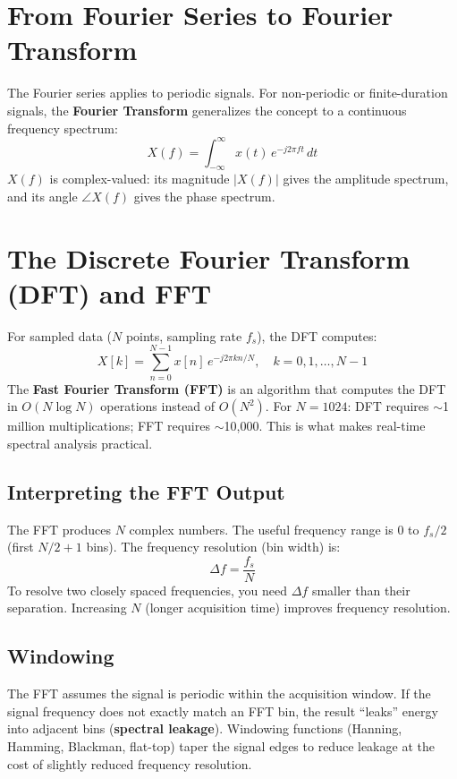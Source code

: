 \documentclass[11pt,letterpaper,twoside,openany]{book}
\begin{document}
\section{From Fourier Series to Fourier Transform}
The Fourier series applies to periodic signals. For non-periodic or finite-duration signals, the \textbf{Fourier Transform} generalizes the concept to a continuous frequency spectrum:
\begin{equation}
X(f) = \int_{-\infty}^{\infty} x(t) \, e^{-j2\pi f t} \, dt
\end{equation}
$X(f)$ is complex-valued: its magnitude $|X(f)|$ gives the amplitude spectrum, and its angle $\angle X(f)$ gives the phase spectrum.

\section{The Discrete Fourier Transform (DFT) and FFT}
For sampled data ($N$ points, sampling rate $f_s$), the DFT computes:
\begin{equation}
X[k] = \sum_{n=0}^{N-1} x[n] \, e^{-j2\pi kn/N}, \quad k = 0, 1, \ldots, N-1
\end{equation}
The \textbf{Fast Fourier Transform (FFT)} is an algorithm that computes the DFT in $O(N \log N)$ operations instead of $O(N^2)$. For $N = 1024$: DFT requires $\sim$1 million multiplications; FFT requires $\sim$10,000. This is what makes real-time spectral analysis practical.

\subsection{Interpreting the FFT Output}
The FFT produces $N$ complex numbers. The useful frequency range is $0$ to $f_s/2$ (first $N/2 + 1$ bins). The frequency resolution (bin width) is:
\begin{equation}
\Delta f = \frac{f_s}{N}
\end{equation}
To resolve two closely spaced frequencies, you need $\Delta f$ smaller than their separation. Increasing $N$ (longer acquisition time) improves frequency resolution.

\subsection{Windowing}
The FFT assumes the signal is periodic within the acquisition window. If the signal frequency does not exactly match an FFT bin, the result ``leaks'' energy into adjacent bins (\textbf{spectral leakage}). Windowing functions (Hanning, Hamming, Blackman, flat-top) taper the signal edges to reduce leakage at the cost of slightly reduced frequency resolution.
\end{document}
